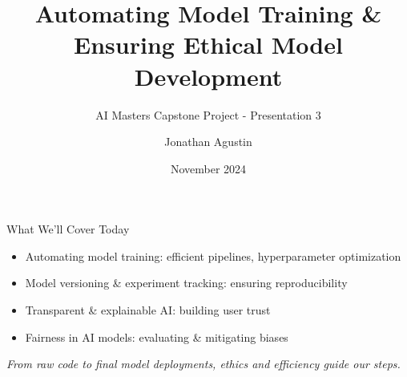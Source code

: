 \documentclass[aspectratio=169]{beamer}
\title{Automating Model Training \& Ensuring Ethical Model Development}
\subtitle{AI Masters Capstone Project - Presentation 3}
\author{Jonathan Agustin}
\date{November 2024}
\begin{document}
%
%
\maketitle

%
%
\begin{frame}{What We’ll Cover Today}
\begin{itemize}
\item Automating model training: efficient pipelines, hyperparameter optimization
\item Model versioning \& experiment tracking: ensuring reproducibility
\item Transparent \& explainable AI: building user trust
\item Fairness in AI models: evaluating \& mitigating biases
\end{itemize}

\vspace{0.8em}
\emph{From raw code to final model deployments, ethics and efficiency guide our steps.}
\end{frame}
\end{document}
